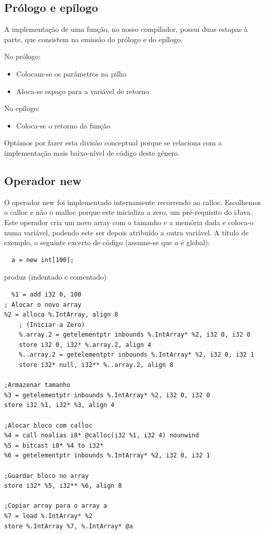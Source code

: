 \documentclass[11pt,a4paper]{article}
\begin{document}
\subsection{Prólogo e epílogo}

A implementação de uma função, no nosso compilador, possui duas estapas à parte, que consistem na emissão do prólogo e do epílogo.

No prólogo:

\begin{itemize}
  \item Colocam-se os parâmetros na pilha
  \item Aloca-se espaço para a variável de retorno
\end{itemize}

No epílogo:

\begin{itemize}
  \item Coloca-se o retorno da função
\end{itemize}

Optámos por fazer esta divisão conceptual porque se relaciona com a implementação mais baixo-nível de código deste género.

\subsection{Operador new}

O operador new foi implementado internamente recorrendo ao calloc. Escolhemos o calloc e não o malloc porque este inicializa a zero, um pré-requisito do iJava. Este operador cria um novo array com o tamanho e a memória dada e coloca-o numa variável, podendo este ser depois atribuído a outra variável. A título de exemplo, o seguinte excerto de código (assume-se que $a$ é global):

\begin{lstlisting}
  a = new int[100];
\end{lstlisting}

produz (indentado e comentado)

\begin{lstlisting}
  %1 = add i32 0, 100
; Alocar o novo array
%2 = alloca %.IntArray, align 8
    ; (Iniciar a Zero)
    %.array.2 = getelementptr inbounds %.IntArray* %2, i32 0, i32 0
    store i32 0, i32* %.array.2, align 4
    %..array.2 = getelementptr inbounds %.IntArray* %2, i32 0, i32 1
    store i32* null, i32** %..array.2, align 8

;Armazenar tamanho
%3 = getelementptr inbounds %.IntArray* %2, i32 0, i32 0
store i32 %1, i32* %3, align 4

;Alocar bloco com calloc
%4 = call noalias i8* @calloc(i32 %1, i32 4) nounwind
%5 = bitcast i8* %4 to i32* 
%6 = getelementptr inbounds %.IntArray* %2, i32 0, i32 1

;Guardar bloco no array
store i32* %5, i32** %6, align 8

;Copiar array para o array a
%7 = load %.IntArray* %2
store %.IntArray %7, %.IntArray* @a
\end{lstlisting}
\end{document}
